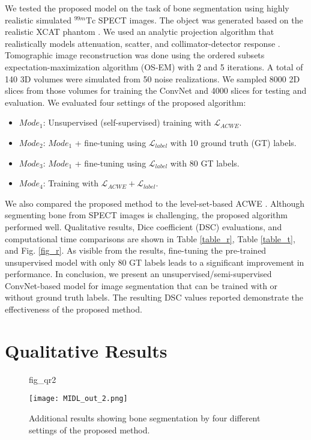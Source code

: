 \documentclass{midl}
\newenvironment{myitemize}
{ \begin{itemize}
    \setlength{\itemsep}{0pt}
    \setlength{\parskip}{0pt}
    \setlength{\parsep}{0pt}
    \setlength{\topsep}{0pt}
    }
{ \end{itemize}                  }
\begin{document}
We tested the proposed model on the task of bone segmentation using highly realistic simulated $^{99m}\text{Tc}$ SPECT images. The object was  generated based on the realistic XCAT phantom \cite{Segars2010}. We used an analytic projection algorithm that realistically models attenuation, scatter, and collimator-detector response \cite{Frey1993,Kadrmas1996}. Tomographic image reconstruction was done using the ordered subsets expectation-maximization algorithm (OS-EM) with 2 and 5 iterations. A total of 140 3D volumes were simulated from 50 noise realizations. We sampled 8000 2D slices from those volumes for training the ConvNet and 4000 slices for testing and evaluation. We evaluated four settings of the proposed algorithm:
\begin{myitemize}
  \item $Mode_1$: Unsupervised (self-supervised) training with $\mathcal{L}_{ACWE}$.
  \item $Mode_2$: $Mode_1$ + fine-tuning using $\mathcal{L}_{label}$ with 10 ground truth (GT) labels.
  \item $Mode_3$: $Mode_1$ + fine-tuning using $\mathcal{L}_{label}$ with 80 GT labels.
  \item $Mode_4$: Training with $\mathcal{L}_{ACWE} + \mathcal{L}_{label}$.
\end{myitemize}
We also compared the proposed method to the level-set-based ACWE \cite{Chan2001}. Although segmenting bone from SPECT images is challenging, the proposed algorithm performed well. Qualitative results, Dice coefficient (DSC) evaluations, and computational time comparisons are shown in Table \ref{table_r}, Table \ref{table_t}, and Fig. \ref{fig_r}. As visible from the results, fine-tuning the pre-trained unsupervised model with only 80 GT labels leads to a significant improvement in performance. In conclusion, we present an unsupervised/semi-supervised ConvNet-based model for image segmentation that can be trained with or without ground truth labels. The resulting DSC values reported demonstrate the effectiveness of the proposed method. 

\appendix

\section{Qualitative Results}

\begin{figure}[!h]
\floatconts
{fig_qr2}
  {\caption{Additional results showing bone segmentation by four different settings of the proposed method.}}
  {\texttt{[image: MIDL\_out\_2.png]}}
\end{figure}
\end{document}
